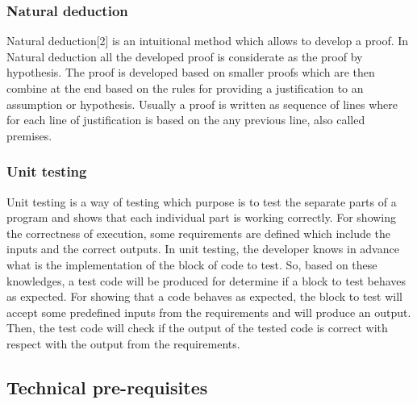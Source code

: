 \documentclass[conference,compsoc]{IEEEtran}
\begin{document}
\subsubsection{Natural deduction}
Natural deduction[2] is an intuitional method which allows to develop a proof. In Natural deduction all the developed proof is considerate as the proof by hypothesis. 
\newline
The proof is developed based on smaller proofs which are then combine at the end based on the rules for providing a justification to an assumption or hypothesis. Usually a proof is written as sequence of lines where for each line of justification is based on the any previous line, also called premises. 

\subsubsection{Unit testing}
Unit testing is a way of testing which purpose is to test the separate parts of a program and shows that each individual part is working correctly.
\newline
For showing the correctness of execution, some requirements are defined which include the inputs and the correct outputs. In unit testing, the developer knows in advance what is the implementation of the block of code to test. So, based on these knowledges, a test code will be produced for determine if a block to test behaves as expected.
\newline
For showing that a code behaves as expected, the block to test will accept some predefined inputs from the requirements and will produce an output. Then, the test code will check if the output of the tested code is correct with respect with the output from the requirements.   

\subsection{Technical pre-requisites}
\end{document}
